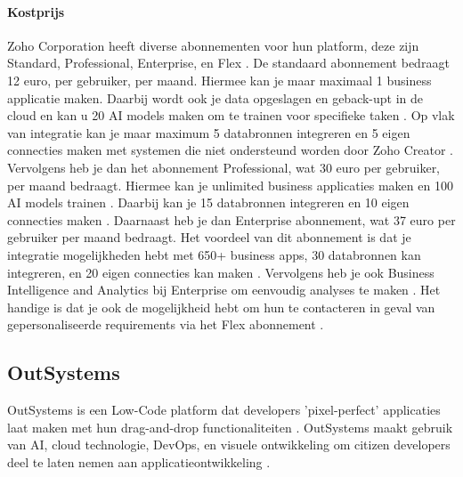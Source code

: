 \paragraph{Kostprijs}
Zoho Corporation heeft diverse abonnementen voor hun platform, deze zijn Standard, Professional, Enterprise, en Flex \autocite{ZohoCorporation2024}.
De standaard abonnement bedraagt 12 euro, per gebruiker, per maand. Hiermee kan je maar maximaal 1 business applicatie maken.
Daarbij wordt ook je data opgeslagen en geback-upt in de cloud en kan u 20 AI models maken om te trainen voor specifieke taken \autocite{ZohoCorporation2024}. Op vlak van integratie
kan je maar maximum 5 databronnen integreren en 5 eigen connecties maken met systemen die niet ondersteund worden door Zoho Creator \autocite{ZohoCorporation2024}. Vervolgens heb je dan het
abonnement Professional, wat 30 euro per gebruiker, per maand bedraagt. Hiermee kan je unlimited business applicaties maken en 100 AI models trainen \autocite{ZohoCorporation2024}. 
Daarbij kan je 15 databronnen integreren en 10 eigen connecties maken \autocite{ZohoCorporation2024}. Daarnaast heb je dan Enterprise abonnement, wat 37 euro per gebruiker per maand bedraagt.
Het voordeel van dit abonnement is dat je integratie mogelijkheden hebt met 650+ business apps, 30 databronnen kan integreren, en 20 eigen connecties kan maken \autocite{ZohoCorporation2024}. Vervolgens heb je ook
Business Intelligence and Analytics bij Enterprise om eenvoudig analyses te maken \autocite{ZohoCorporation2024}. Het handige is dat je ook de mogelijkheid hebt om hun te contacteren in geval 
van gepersonaliseerde requirements via het Flex abonnement \autocite{ZohoCorporation2024}.

\subsection{OutSystems}%
\label{subsec:outsystems}
OutSystems is een Low-Code platform dat developers 'pixel-perfect' applicaties laat maken met hun drag-and-drop functionaliteiten \autocite{Ranosys2023} \autocite{Payne2023}.
OutSystems maakt gebruik van AI, cloud technologie, DevOps, en visuele ontwikkeling om citizen developers deel te laten nemen aan applicatieontwikkeling \autocite{Ranosys2023}.

